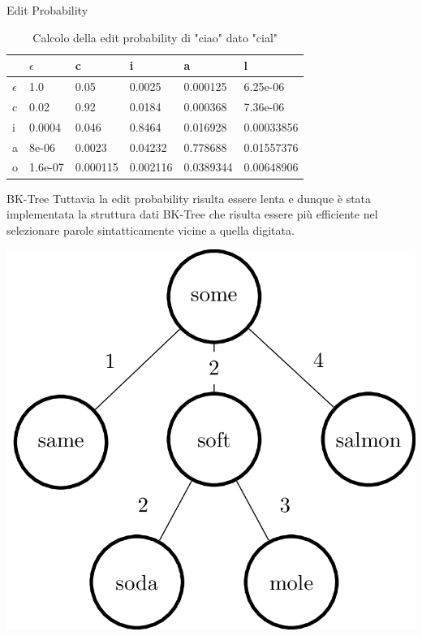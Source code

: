 \documentclass[aspectratio=169]{beamer}
\begin{document}
 \begin{frame}{Edit Probability}
 	    \begin{table}
    \centering
    \begin{tabular}{l|l|l|l|l|l}
               & $\epsilon$ & c        & i        & a        & l \\ \hline
	$\epsilon$ & 1.0        & 0.05     & 0.0025   & 0.000125  & 6.25e-06    \\
    c          & 0.02       & 0.92     & 0.0184   & 0.000368  & 7.36e-06    \\
    i          & 0.0004     & 0.046    & 0.8464   & 0.016928  & 0.00033856  \\
    a          & 8e-06      & 0.0023   & 0.04232  & 0.778688  & 0.01557376  \\
    o          & 1.6e-07    & 0.000115 & 0.002116 & 0.0389344 & 0.00648906  \\

    \end{tabular}
    \caption{Calcolo della edit probability di "ciao" dato "cial"}
    \end{table}
 \end{frame}
 
 \begin{frame}{BK-Tree}
 	Tuttavia la edit probability risulta essere lenta e dunque è stata implementata la
 	struttura dati BK-Tree che risulta essere più efficiente nel selezionare parole
 	 sintatticamente vicine	a quella digitata. 
 	 \pause
 	 \begin{center}
 	 \includegraphics[height=0.6\textheight]{bk-tree.png}
 	 \end{center}
\end{frame}
\end{document}
